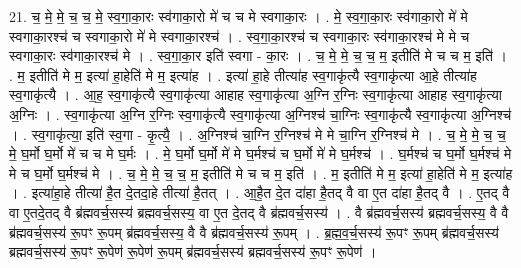 \documentclass[17pt]{extarticle}
\begin{document}
21. च॒ मे॒ मे॒ च॒ च॒ मे॒ स्व॒गा॒का॒रः स्व॑गाका॒रो मे॑ च च मे स्वगाका॒रः । . मे॒ स्व॒गा॒का॒रः स्व॑गाका॒रो मे॑ मे स्वगाका॒रश्च॑ च स्वगाका॒रो मे॑ मे स्वगाका॒रश्च॑ । . स्व॒गा॒का॒रश्च॑ च स्वगाका॒रः स्व॑गाका॒रश्च॑ मे मे च स्वगाका॒रः स्व॑गाका॒रश्च॑ मे । . स्व॒गा॒का॒र इति॑ स्वगा - का॒रः । . च॒ मे॒ मे॒ च॒ च॒ म॒ इतीति॑ मे च च म॒ इति॑ । . म॒ इतीति॑ मे म॒ इत्या॑ हा॒हेति॑ मे म॒ इत्या॑ह । . इत्या॑ हा॒हे तीत्या॑ह स्व॒गाकृ॑त्यै स्व॒गाकृ॑त्या आ॒हे तीत्या॑ह स्व॒गाकृ॑त्यै । . आ॒ह॒ स्व॒गाकृ॑त्यै स्व॒गाकृ॑त्या आहाह स्व॒गाकृ॑त्या अ॒ग्नि र॒ग्निः स्व॒गाकृ॑त्या आहाह स्व॒गाकृ॑त्या अ॒ग्निः । . स्व॒गाकृ॑त्या अ॒ग्नि र॒ग्निः स्व॒गाकृ॑त्यै स्व॒गाकृ॑त्या अ॒ग्निश्च॑ चा॒ग्निः स्व॒गाकृ॑त्यै स्व॒गाकृ॑त्या अ॒ग्निश्च॑ । . स्व॒गाकृ॑त्या॒ इति॑ स्व॒गा - कृ॒त्यै॒ । . अ॒ग्निश्च॑ चा॒ग्नि र॒ग्निश्च॑ मे मे चा॒ग्नि र॒ग्निश्च॑ मे । . च॒ मे॒ मे॒ च॒ च॒ मे॒ घ॒र्मो घ॒र्मो मे॑ च च मे घ॒र्मः । . मे॒ घ॒र्मो घ॒र्मो मे॑ मे घ॒र्मश्च॑ च घ॒र्मो मे॑ मे घ॒र्मश्च॑ । . घ॒र्मश्च॑ च घ॒र्मो घ॒र्मश्च॑ मे मे च घ॒र्मो घ॒र्मश्च॑ मे । . च॒ मे॒ मे॒ च॒ च॒ म॒ इतीति॑ मे च च म॒ इति॑ । . म॒ इतीति॑ मे म॒ इत्या॑ हा॒हेति॑ मे म॒ इत्या॑ह । . इत्या॑हा॒हे तीत्या॑ है॒त दे॒तदा॒हे तीत्या॑ है॒तत् । . आ॒है॒त दे॒त दा॑हा है॒तद् वै वा ए॒त दा॑हा है॒तद् वै । . ए॒तद् वै वा ए॒तदे॒तद् वै ब्र॑ह्मवर्च॒सस्य॑ ब्रह्मवर्च॒सस्य॒ वा ए॒त दे॒तद् वै ब्र॑ह्मवर्च॒सस्य॑ । . वै ब्र॑ह्मवर्च॒सस्य॑ ब्रह्मवर्च॒सस्य॒ वै वै ब्र॑ह्मवर्च॒सस्य॑ रू॒पꣳ रू॒पम् ब्र॑ह्मवर्च॒सस्य॒ वै वै ब्र॑ह्मवर्च॒सस्य॑ रू॒पम् । . ब्र॒ह्म॒व॒र्च॒सस्य॑ रू॒पꣳ रू॒पम् ब्र॑ह्मवर्च॒सस्य॑ ब्रह्मवर्च॒सस्य॑ रू॒पꣳ रू॒पेण॑ रू॒पेण॑ रू॒पम् ब्र॑ह्मवर्च॒सस्य॑ ब्रह्मवर्च॒सस्य॑ रू॒पꣳ रू॒पेण॑ । \newline
\end{document}
